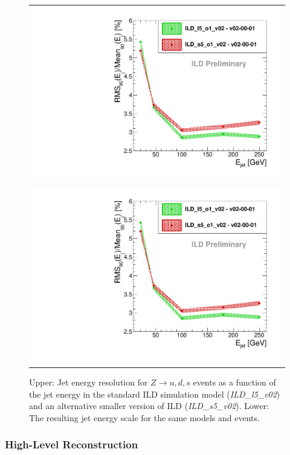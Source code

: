 \begin{figure}
  \begin{tabular}[c]{c}
    \includegraphics[width=0.85\hsize]{chapters/figures/JERLargeSmall_v02-00-01.pdf} \\
    \includegraphics[width=0.85\hsize]{chapters/figures/JESLargeSmall_v02-00-01.pdf}
  \end{tabular}
  \caption{Upper: Jet energy resolution for $Z\rightarrow u,d,s$ events as a function of the jet energy in the standard ILD simulation model
    (\emph{ILD\_l5\_v02}) and an alternative smaller version of ILD  (\emph{ILD\_s5\_v02}).
    Lower: The resulting jet energy scale for the same models and events.} 
\label{fig:ild_jer_jes}
\end{figure}


  

\subsubsection{High-Level Reconstruction}

